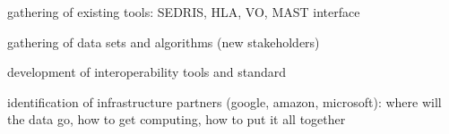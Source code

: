 gathering of existing tools: SEDRIS, HLA, VO, MAST interface

gathering of data sets and algorithms (new stakeholders)

development of interoperability tools and standard

identification of infrastructure partners (google, amazon, microsoft):
where will the data go, how to get computing, how to put it all together
